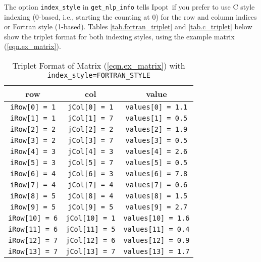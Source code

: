 \documentclass[10pt]{article}
\newcommand{\Ipopt}{{\sc Ipopt}}
\begin{document}
The option {\tt index\_style} in {\tt get\_nlp\_info} tells \Ipopt\ if
you prefer to use C style indexing (0-based, i.e., starting the
counting at 0) for the row and column indices or Fortran style
(1-based). Tables \ref{tab.fortran_triplet} and \ref{tab.c_triplet}
below show the triplet format for both indexing styles, using the
example matrix (\ref{eqn.ex_matrix}).

\begin{footnotesize}
\begin{table}[ht]%
\begin{center}
\begin{tabular}{c c c}
row     		&       col     	&       value 			    \\
\hline
{\tt iRow[0] = 1}       &       {\tt jCol[0] = 1}       & {\tt values[0] = 1.1}     \\
{\tt iRow[1] = 1}       &       {\tt jCol[1] = 7}       & {\tt values[1] = 0.5}     \\
{\tt iRow[2] = 2}       &       {\tt jCol[2] = 2}       & {\tt values[2] = 1.9}     \\
{\tt iRow[3] = 2}       &       {\tt jCol[3] = 7}       & {\tt values[3] = 0.5}     \\
{\tt iRow[4] = 3}       &       {\tt jCol[4] = 3}       & {\tt values[4] = 2.6}     \\
{\tt iRow[5] = 3}       &       {\tt jCol[5] = 7}       & {\tt values[5] = 0.5}     \\
{\tt iRow[6] = 4}       &       {\tt jCol[6] = 3}       & {\tt values[6] = 7.8}     \\
{\tt iRow[7] = 4}       &       {\tt jCol[7] = 4}       & {\tt values[7] = 0.6}     \\
{\tt iRow[8] = 5}       &       {\tt jCol[8] = 4}       & {\tt values[8] = 1.5}     \\
{\tt iRow[9] = 5}       &       {\tt jCol[9] = 5}       & {\tt values[9] = 2.7}     \\
{\tt iRow[10] = 6}      &       {\tt jCol[10] = 1}      & {\tt values[10] = 1.6}     \\
{\tt iRow[11] = 6}      &       {\tt jCol[11] = 5}      & {\tt values[11] = 0.4}     \\
{\tt iRow[12] = 7}      &       {\tt jCol[12] = 6}      & {\tt values[12] = 0.9}     \\
{\tt iRow[13] = 7}      &       {\tt jCol[13] = 7}      & {\tt values[13] = 1.7}
\end{tabular}
\caption{Triplet Format of Matrix (\ref{eqn.ex_matrix}) 
with {\tt index\_style=FORTRAN\_STYLE}}

\end{center}
\end{table}
\end{footnotesize}
\end{document}
